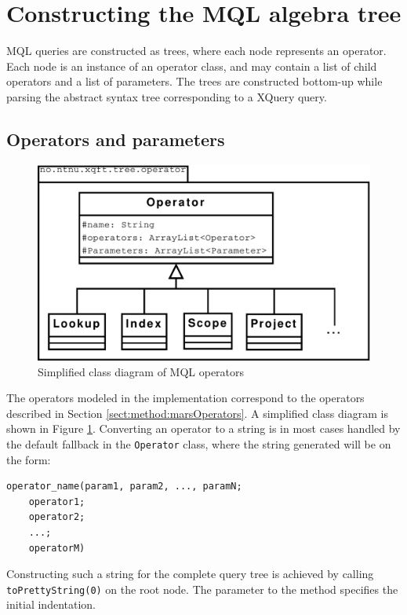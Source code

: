 \section{Constructing the MQL algebra tree}
\label{sect:impl:construct_mql}
MQL queries are constructed as trees, where each node represents an operator. Each node is an instance of an
operator class, and may contain a list of child operators and a list of parameters. The trees are constructed
bottom-up while parsing the abstract syntax tree corresponding to a XQuery query.

\subsection{Operators and parameters}
\begin{figure}[!htp]
\begin{center}
  \includegraphics[scale=0.5]{diagrams/mql_operator_uml}
  \caption{Simplified class diagram of MQL operators}
  \label{fig:impl:mql_op_uml}
\end{center}
\end{figure}
The operators modeled in the implementation correspond to the operators
described in Section \ref{sect:method:marsOperators}. A simplified class
diagram is shown in Figure \ref{fig:impl:mql_op_uml}. Converting an operator to a string is in most cases
handled by the default fallback in the \texttt{Operator} class, where the string generated will be on the form:
\begin{Verbatim}
operator_name(param1, param2, ..., paramN; 
    operator1;
    operator2; 
    ...; 
    operatorM)
\end{Verbatim}

Constructing such a string for the complete query tree is achieved by calling \texttt{toPrettyString(0)} on the
root node. The parameter to the method specifies the initial indentation.

